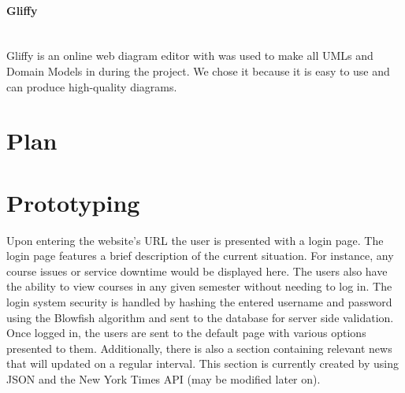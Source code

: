 \documentclass[12pt]{article}
\begin{document}
\paragraph*{Gliffy}~\\
Gliffy is an online web diagram editor with was used to make all UMLs and Domain Models in during the project. We chose it because it is easy to use and can produce high-quality diagrams.
%
\vfill
\newpage
\section{Plan}



\vfill
\newpage

\section{Prototyping}

Upon entering the website’s URL the user is presented with a login page. The login page features a brief description of the current situation. For instance, any course issues or service downtime would be displayed here. The users also have the ability to view courses in any given semester without needing to log in. The login system security is handled by hashing the entered username and password using the Blowfish algorithm and sent to the database for server side validation. 
Once logged in, the users are sent to the default page with various options presented to them.  Additionally, there is also a section containing relevant news that will updated on a regular interval. This section is currently created by using JSON and the New York Times API (may be modified later on). 
\end{document}
